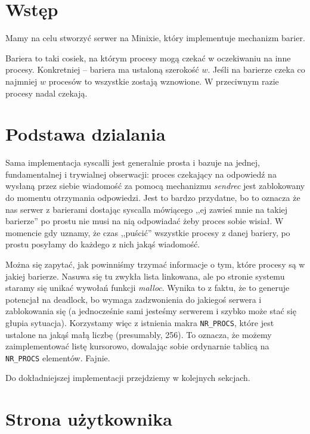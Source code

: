 \section{Wstęp}
Mamy na celu stworzyć serwer na Minixie, który implementuje mechanizm barier.

Bariera to taki cosiek, na którym procesy mogą czekać w oczekiwaniu na inne procesy.
Konkretniej -- bariera ma ustaloną szerokość \( w \). Jeśli na barierze czeka co najmniej \( w \) procesów
to wszystkie zostają wznowione. W przeciwnym razie procesy nadal czekają.

\section{Podstawa dzialania}

Sama implementacja syscalli jest generalnie prosta i bazuje na jednej, fundamentalnej i trywialnej obserwacji: proces czekający na odpowiedź na wysłaną przez siebie wiadomość za pomocą mechanizmu \textit{sendrec} jest zablokowany do momentu otrzymania odpowiedzi. Jest to bardzo przydatne, bo to oznacza że nas serwer z barierami dostając syscalla mówiącego ,,ej zawieś mnie na takiej barierze'' po prostu nie musi na nią odpowiadać żeby proces sobie wisiał. W momencie gdy uznamy, że czas ,,puścić'' wszystkie procesy z danej bariery, po prostu posyłamy do każdego z nich jakąś wiadomość.

Można się zapytać, jak powinniśmy trzymać informacje o tym, które procesy są w jakiej barierze. Nasuwa się tu zwykła lista linkowana, ale po stronie systemu staramy się unikać wywołań funkcji \textit{malloc}. Wynika to z faktu, że to generuje potencjał na deadlock, bo wymaga zadzwonienia do jakiegoś serwera i zablokowania się (a jednocześnie sami jesteśmy serwerem i szybko może stać się głupia sytuacja). Korzystamy więc z istnienia makra \texttt{NR\_PROCS}, które jest ustalone na jakąś małą liczbę (presumably, 256). To oznacza, że możemy zaimplementować listę kursorowo, dowalając sobie ordynarnie tablicą na \texttt{NR\_PROCS} elementów. Fajnie.

Do dokładniejszej implementacji przejdziemy w kolejnych sekcjach.

\section{Strona użytkownika}

